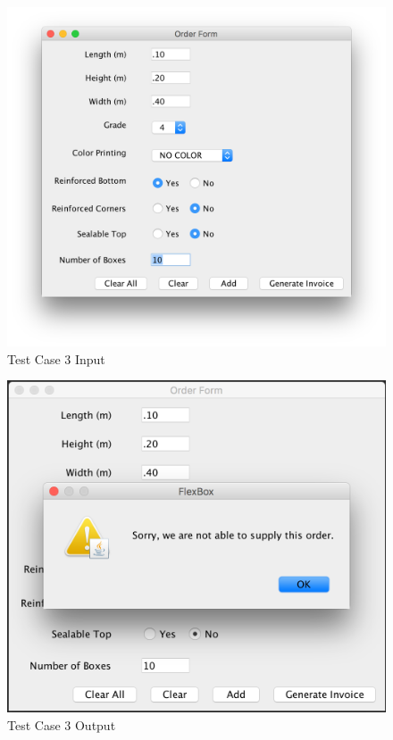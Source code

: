 \documentclass[12pt]{article}
\begin{document}
\begin{figure}[H]
	\includegraphics[width=\linewidth]{./screenshots/test_case_3_input.png}
	\caption{Test Case 3 Input}
	\label{test_case_3_input}
\end{figure}
\begin{figure}[H]
	\includegraphics[width=\linewidth]{./screenshots/test_case_3_output.png}
	\caption{Test Case 3 Output}
	\label{test_case_3_output}
\end{figure}
\end{document}

